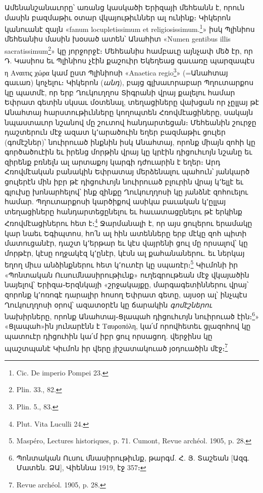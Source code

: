 \documentclass{article}
\begin{document}
{Ամենանշանաւորը՝ առանց կասկածի Երիզայի մեհեանն է, որուն մասին բազմաթիւ օտար վկայութիւններ ալ ունինք։ Կիկերոն կանուանէ զայն «fanum locupletissimum et religiosissimum.\footnote{Cic. De imperio Pompei 23.}» իսկ Պլինիոս մեհեանիս մասին խօսած ատեն՝ Անահիտ «Numen gentibus illis sacratissimum\footnote{Plin. 33., 82.}» կը յորջորջէ։ Մեհեանիս համբաւը այնչափ մեծ էր, որ Դ. Կասիոս եւ Պլինիոս չէին քաշուիր Եկեղեաց գաւառը պարզապէս η Αναιτις χώρα կամ ըստ Պլինիոսի «Anaetica regio\footnote{Plin. 5., 83.}» (=Անահտայ գաւառ) կոչելու։ Կիկերոն (\emph{անդ}), բայց գլխաւորաբար Պղուտարքոս կը պատմէ, որ երբ Ղուկուղղոս Տիգրանի վրայ քալելու համար Եփրատ գետին սկսաւ մօտենալ, տեղացիները վախցան որ չըլլայ թէ Անահտայ հարստութիւնները կողոպտեն Հռովմէացիները, սակայն նպաստաւոր նշանով մը շուտով հանդարտեցան։ Մեհեանին շուրջը դաշտերուն մէջ ազատ կ՚արածուին եղեր բազմաթիւ ցուլեր (գոմէշներ)՝ նուիրուած ինքնին իսկ Անահտայ, որոնք միայն զոհի կը գործածուէին եւ իրենց մորթին վրայ կը կրէին դիցուհւոյն նշանը եւ զիրենք բռնելն ալ արտաքոյ կարգի դժուարին է եղեր։ Արդ Հռովմէական բանակին Եփրատայ մերձենալու պահուն՝ յանկարծ ցուլերէն մին իբր թէ դիցուհւոյն նուիրուած բլուրին վրայ կ՚ելլէ եւ գլուխը խոնարհելով՝ ինք զինքը Ղուկուղղոսի կը յանձնէ զոհուելու համար. Պղուտարքոսի կարծիքով ասիկա բաւական կ՚ըլլայ տեղացիները հանդարտեցընելու եւ հաւատացընելու թէ երկինք Հռովմէացիներու հետ է։\footnote{Plut. Vita Luculli 24.} Ջարմանալի է, որ այս ցուլերու երամակը կար նաեւ Եգիպտոս, հո՛ն ալ հին ատենները երբ մէկը զոհ պիտի մատուցանէր, դաշտ կ՚երթար եւ կէս վայրենի ցուլ մը որսալով՝ կը մորթէր, կէսը ողջակէզ կ՚ընէր, կէսն ալ քահանաներու. եւ ներկայ եղող միւս անձինքներու հետ կ՚ուտէր կը սպառէր։\footnote{Maspéro, Lectures historiques, p. 71. Cumont, Revue archéol. 1905, p. 28.} Կիւմոնի իր «Պոնտական Ուսումնասիրութիւնք» ուղեգրութեան մէջ վկայածին նայելով՝ Երիզա֊Երզնկայի «շրջակայքը, մարգագետիններու վրայ՝ զորոնք կ՚ոռոգէ դարալիր հոսող Եփրատ գետը, այսօր ալ՝ ինչպէս Ղուկուղղոսի օրով՝ ազատօրէն կը ճարակին \emph{գոմէշներու} նախիրները, որոնք Անահտայ֊Ցլապահ դիցուհւոյն նուիրուած էին։\footnote{Պոնտական Ուսու մնասիրութիւնք, թարգմ. Հ. Յ. Տաշեան [Ազգ. Մատեն. ՁԱ], Վիեննա 1919, էջ 357։}» «Ցլապահ»ին յունարէնն է Ταυροπόλη, կա՛մ որովհետեւ ցլազոհով կը պատուէր դիցուհին կա՛մ իբր ցուլ որսացող. վերջինս կը պաշտպանէ Կիւմոն իր վերը յիշատակուած յօդուածին մէջ։\footnote{Revue archéol. 1905, p. 28.}

}
\end{document}
